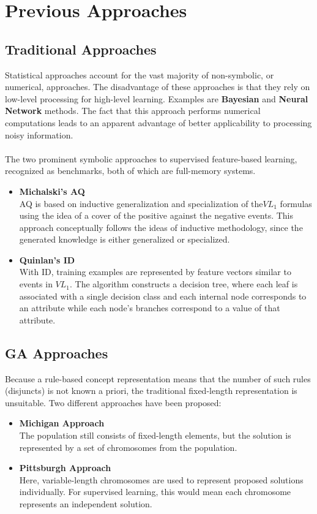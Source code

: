 \documentclass[../main.tex]{subfiles}
\begin{document}
\section{Previous Approaches}

\subsection{Traditional Approaches}
Statistical approaches account for the vast majority of non-symbolic, or numerical, approaches. The disadvantage of
these approaches is that they rely on low-level processing for high-level learning. Examples are \textbf{Bayesian} and
\textbf{Neural Network} methods. The fact that this approach performs numerical computations leads to an
apparent advantage of better applicability to processing noisy information.
\\\\
The two prominent symbolic approaches to supervised feature-based learning, recognized
as benchmarks, both of which are full-memory systems.

\begin{itemize}
	\item \textbf{Michalski's AQ} \\
	AQ is based on inductive generalization and specialization of the$VL_1$ formulas using the idea of a cover of the
	positive against the negative events. This approach conceptually follows the ideas of inductive methodology, since
	the generated knowledge is either generalized or specialized.
	\item \textbf{Quinlan's  ID} \\
	With ID, training examples are represented by feature vectors similar to events in $VL_1$.  The algorithm
	constructs a decision tree, where each leaf is associated with a single decision class and each internal node
	corresponds to an attribute while each node's branches correspond to a value of that attribute.
\end{itemize}

\subsection{GA Approaches}
Because a rule-based concept representation means that the number of such rules (disjuncts) is not known a priori,  the
traditional fixed-length representation is unsuitable. Two different approaches have been proposed:

\begin{itemize}
	\item \textbf{Michigan Approach} \\
	The population still consists of fixed-length elements, but the solution is represented by a set of chromosomes
	from the population.
	\item \textbf{Pittsburgh Approach} \\
	Here, variable-length chromosomes are used to represent proposed solutions individually. For supervised learning,
	this would mean each chromosome represents an independent solution.
\end{itemize}
\end{document}
